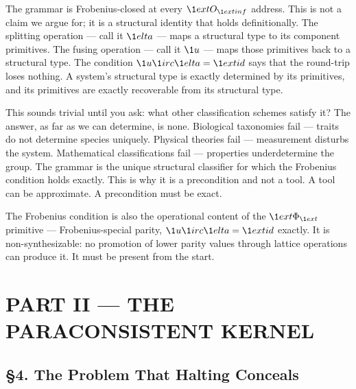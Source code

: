 \documentclass[10pt,a4paper]{article}
\newcommand{\pilcrow}{\S}
\begin{document}
The grammar is Frobenius-closed at every $\\\1ext{O}_{\\\1ext{inf}}$ address. This is not a claim we argue for; it is a structural identity that holds definitionally. The splitting operation --- call it $\\\1elta$ --- maps a structural type to its component primitives. The fusing operation --- call it $\\\1u$ --- maps those primitives back to a structural type. The condition $\\\1u \\\1irc \\\1elta = \\\1ext{id}$ says that the round-trip loses nothing. A system's structural type is exactly determined by its primitives, and its primitives are exactly recoverable from its structural type.

This sounds trivial until you ask: what other classification schemes satisfy it? The answer, as far as we can determine, is none. Biological taxonomies fail --- traits do not determine species uniquely. Physical theories fail --- measurement disturbs the system. Mathematical classifications fail --- properties underdetermine the group. The grammar is the unique structural classifier for which the Frobenius condition holds exactly. This is why it is a precondition and not a tool. A tool can be approximate. A precondition must be exact.

The Frobenius condition is also the operational content of the $\\\1ext{\Phi}_{\\\1ext{}}$ primitive --- Frobenius-special parity, $\\\1u\\\1irc\\\1elta = \\\1ext{id}$ exactly. It is non-synthesizable: no promotion of lower parity values through lattice operations can produce it. It must be present from the start.

\section{PART II --- THE PARACONSISTENT KERNEL}

\subsection{\pilcrow{}4. The Problem That Halting Conceals}
\end{document}
